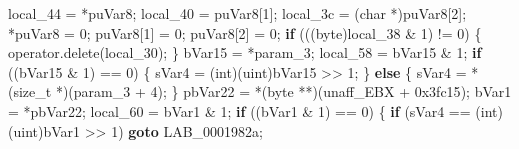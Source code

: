 \documentclass[
]{article}
\newenvironment{Shaded}{}{}
\newcommand{\BaseNTok}[1]{\textcolor[rgb]{0.25,0.63,0.44}{#1}}
\newcommand{\ControlFlowTok}[1]{\textcolor[rgb]{0.00,0.44,0.13}{\textbf{#1}}}
\newcommand{\DataTypeTok}[1]{\textcolor[rgb]{0.56,0.13,0.00}{#1}}
\newcommand{\DecValTok}[1]{\textcolor[rgb]{0.25,0.63,0.44}{#1}}
\newcommand{\NormalTok}[1]{#1}
\newcommand{\OperatorTok}[1]{\textcolor[rgb]{0.40,0.40,0.40}{#1}}
\begin{document}
\begin{Shaded}
\begin{Highlighting}[]
\NormalTok{  local\_44 }\OperatorTok{=} \OperatorTok{*}\NormalTok{puVar8}\OperatorTok{;}
\NormalTok{  local\_40 }\OperatorTok{=}\NormalTok{ puVar8}\OperatorTok{[}\DecValTok{1}\OperatorTok{];}
\NormalTok{  local\_3c }\OperatorTok{=} \OperatorTok{(}\DataTypeTok{char} \OperatorTok{*)}\NormalTok{puVar8}\OperatorTok{[}\DecValTok{2}\OperatorTok{];}
  \OperatorTok{*}\NormalTok{puVar8 }\OperatorTok{=} \DecValTok{0}\OperatorTok{;}
\NormalTok{  puVar8}\OperatorTok{[}\DecValTok{1}\OperatorTok{]} \OperatorTok{=} \DecValTok{0}\OperatorTok{;}
\NormalTok{  puVar8}\OperatorTok{[}\DecValTok{2}\OperatorTok{]} \OperatorTok{=} \DecValTok{0}\OperatorTok{;}
  \ControlFlowTok{if} \OperatorTok{(((}\NormalTok{byte}\OperatorTok{)}\NormalTok{local\_38 }\OperatorTok{\&} \DecValTok{1}\OperatorTok{)} \OperatorTok{!=} \DecValTok{0}\OperatorTok{)} \OperatorTok{\{}
\NormalTok{    operator}\OperatorTok{.}\NormalTok{delete}\OperatorTok{(}\NormalTok{local\_30}\OperatorTok{);}
  \OperatorTok{\}}
\NormalTok{  bVar15 }\OperatorTok{=} \OperatorTok{*}\NormalTok{param\_3}\OperatorTok{;}
\NormalTok{  local\_58 }\OperatorTok{=}\NormalTok{ bVar15 }\OperatorTok{\&} \DecValTok{1}\OperatorTok{;}
  \ControlFlowTok{if} \OperatorTok{((}\NormalTok{bVar15 }\OperatorTok{\&} \DecValTok{1}\OperatorTok{)} \OperatorTok{==} \DecValTok{0}\OperatorTok{)} \OperatorTok{\{}
\NormalTok{    sVar4 }\OperatorTok{=} \OperatorTok{(}\DataTypeTok{int}\OperatorTok{)(}\NormalTok{uint}\OperatorTok{)}\NormalTok{bVar15 }\OperatorTok{\textgreater{}\textgreater{}} \DecValTok{1}\OperatorTok{;}
  \OperatorTok{\}}
  \ControlFlowTok{else} \OperatorTok{\{}
\NormalTok{    sVar4 }\OperatorTok{=} \OperatorTok{*(}\DataTypeTok{size\_t} \OperatorTok{*)(}\NormalTok{param\_3 }\OperatorTok{+} \DecValTok{4}\OperatorTok{);}
  \OperatorTok{\}}
\NormalTok{  pbVar22 }\OperatorTok{=} \OperatorTok{*(}\NormalTok{byte }\OperatorTok{**)(}\NormalTok{unaff\_EBX }\OperatorTok{+} \BaseNTok{0x3fc15}\OperatorTok{);}
\NormalTok{  bVar1 }\OperatorTok{=} \OperatorTok{*}\NormalTok{pbVar22}\OperatorTok{;}
\NormalTok{  local\_60 }\OperatorTok{=}\NormalTok{ bVar1 }\OperatorTok{\&} \DecValTok{1}\OperatorTok{;}
  \ControlFlowTok{if} \OperatorTok{((}\NormalTok{bVar1 }\OperatorTok{\&} \DecValTok{1}\OperatorTok{)} \OperatorTok{==} \DecValTok{0}\OperatorTok{)} \OperatorTok{\{}
    \ControlFlowTok{if} \OperatorTok{(}\NormalTok{sVar4 }\OperatorTok{==} \OperatorTok{(}\DataTypeTok{int}\OperatorTok{)(}\NormalTok{uint}\OperatorTok{)}\NormalTok{bVar1 }\OperatorTok{\textgreater{}\textgreater{}} \DecValTok{1}\OperatorTok{)} \ControlFlowTok{goto}\NormalTok{ LAB\_0001982a}\OperatorTok{;}

\end{Highlighting}
\end{Shaded}
\end{document}
